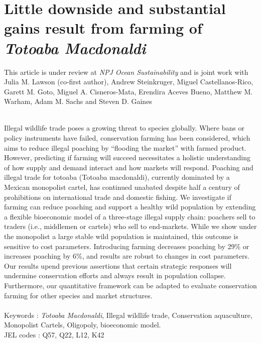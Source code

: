 \chapter{Little downside and substantial gains result from farming of \textit{Totoaba Macdonaldi}}

\begin{center}
\begin{minipage}{0.9\textwidth}
\singlespacing
This article is under review at \textit{NPJ Ocean Sustainability} and is joint work with Julia M. Lawson (co-first author), Andrew Steinkruger, Miguel Castellanos-Rico, Garett M. Goto, Miguel A. Cisneros-Mata, Erendira Aceves Bueno, Matthew M. Warham, Adam M. Sachs and Steven D. Gaines\\\\
\end{minipage}

\begin{minipage}{0.9\textwidth}
    \singlespacing
Illegal wildlife trade poses a growing threat to species globally. Where bans or policy instruments have failed, conservation farming has been considered, which aims to reduce illegal poaching by “flooding the market” with farmed product. However, predicting if farming will succeed necessitates a holistic understanding of how supply and demand interact and how markets will respond. Poaching and illegal trade for totoaba (Totoaba macdonaldi), currently dominated by a Mexican monopolist cartel, has continued unabated despite half a century of prohibitions on international trade and domestic fishing. We investigate if farming can reduce poaching and support a healthy wild population by extending a flexible bioeconomic model of a three-stage illegal supply chain: poachers sell to traders (i.e., middlemen or cartels) who sell to end-markets. While we show under the monopolist a large stable wild population is maintained, this outcome is sensitive to cost parameters. Introducing farming decreases poaching by 29\% or increases poaching by 6\%, and results are robust to changes in cost parameters. Our results upend previous assertions that certain strategic responses will undermine conservation efforts and always result in population collapse. Furthermore, our quantitative framework can be adapted to evaluate conservation farming for other species and market structures.\\\\
Keywords : \textit{Totoaba Macdonaldi}, Illegal wildlife trade, Conservation aquaculture, Monopolist Cartels, Oligopoly, bioeconomic model. \\
JEL codes : Q57, Q22, L12, K42
\end{minipage}
\end{center}
    \vfill


